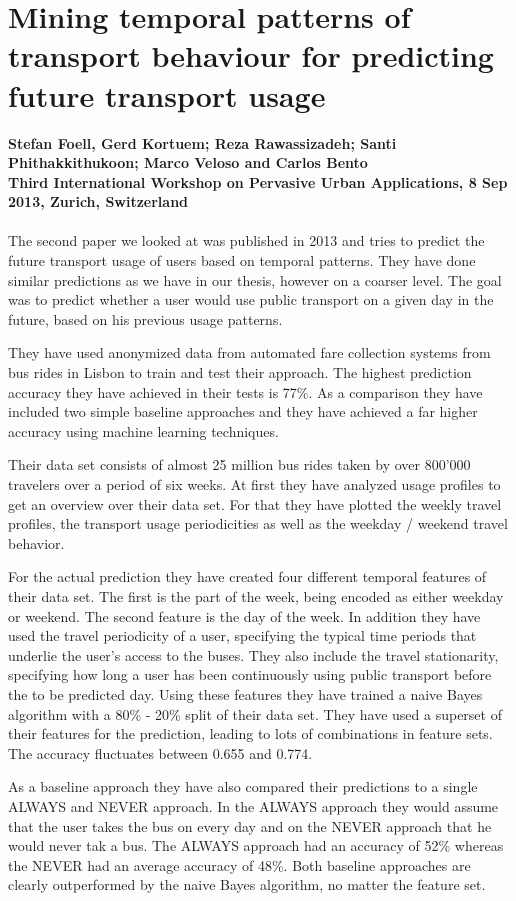 \section{Mining temporal patterns of transport behaviour for predicting future transport usage}
\textbf{Stefan Foell, Gerd Kortuem; Reza Rawassizadeh; Santi Phithakkithukoon; Marco Veloso and Carlos Bento\\
Third International Workshop on Pervasive Urban Applications, 8 Sep 2013, Zurich, Switzerland}
\\
\\
The second paper we looked at was published in 2013 and tries to predict the future transport usage of users based on temporal patterns. They have done similar predictions as we have in our thesis, however on a coarser level. The goal was to predict whether a user would use public transport on a given day in the future, based on his previous usage patterns.

They have used anonymized data from automated fare collection systems from bus rides in Lisbon to train and test their approach. The highest prediction accuracy they have achieved in their tests is 77\%. As a comparison they have included two simple baseline approaches and they have achieved a far higher accuracy using machine learning techniques.

Their data set consists of almost 25 million bus rides taken by over 800'000 travelers over a period of six weeks. At first they have analyzed usage profiles to get an overview over their data set. For that they have plotted the weekly travel profiles, the transport usage periodicities as well as the weekday / weekend travel behavior.

For the actual prediction they have created four different temporal features of their data set. The first is the part of the week, being encoded as either weekday or weekend. The second feature is the day of the week. In addition they have used the travel periodicity of a user, specifying the typical time periods that underlie the user's access to the buses. They also include the travel stationarity, specifying how long a user has been continuously using public transport before the to be predicted day. Using these features they have trained a naive Bayes algorithm with a 80\% - 20\% split of their data set. They have used a superset of their features for the prediction, leading to lots of combinations in feature sets. The accuracy fluctuates between 0.655 and 0.774. 

As a baseline approach they have also compared their predictions to a single ALWAYS and NEVER approach. In the ALWAYS approach they would assume that the user takes the bus on every day and on the NEVER approach that he would never tak a bus. The ALWAYS approach had an accuracy of 52\% whereas the NEVER had an average accuracy of 48\%. Both baseline approaches are clearly outperformed by the naive Bayes algorithm, no matter the feature set.

